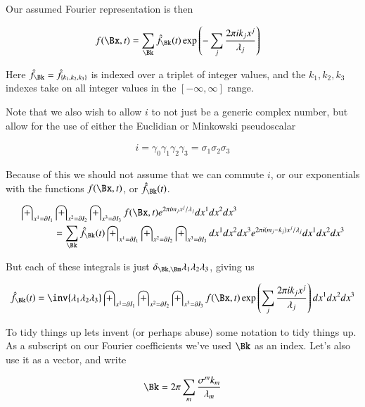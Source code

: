 \documentclass{article}
\begin{document}
Our assumed Fourier representation is then

\begin{align*}
f(\Bx, t) &= \sum_{\Bk} \hat{f}_{\Bk}(t) \exp\left( - \sum_j \frac{2 \pi i k_j x^j}{\lambda_j} \right)
\end{align*}

Here $\hat{f}_{\Bk} = \hat{f}_{\{k_1, k_2, k_3\}}$ is indexed over a triplet of integer values, and the $k_1, k_2, k_3$ indexes take on all integer values in the $[-\infty, \infty]$ range.

Note that we also wish to allow $i$ to not just be a generic complex number, but allow for the use of either the Euclidian or Minkowski pseudoscalar

\begin{align*}
i = \gamma_0 \gamma_1 \gamma_2 \gamma_3 = \sigma_1 \sigma_2 \sigma_3
\end{align*}

Because of this we should not assume that we can commute $i$, or our exponentials with the functions $f(\Bx,t)$, or $\hat{f}_{\Bk}(t)$.

\begin{align*}
\int_{x^1 = \partial I_1} &\int_{x^2 = \partial I_2} \int_{x^3 = \partial I_3} f(\Bx, t) 
e^{ 2 \pi i m_j x^j/\lambda_j}
dx^1 dx^2 dx^3 \\
&= \sum_{\Bk} \hat{f}_{\Bk}(t) \int_{x^1 = \partial I_1} \int_{x^2 = \partial I_2} \int_{x^3 = \partial I_3} dx^1 dx^2 dx^3 e^{ 2 \pi i (m_j - k_j) x^j/\lambda_j} dx^1 dx^2 dx^3
\end{align*}

But each of these integrals is just $\delta_{\Bk,\Bm} \lambda_1 \lambda_2 \lambda_3$, giving us

\begin{align*}
\hat{f}_{\Bk}(t)
&= \inv{\lambda_1 \lambda_2 \lambda_3 } \int_{x^1 = \partial I_1} \int_{x^2 = \partial I_2} \int_{x^3 = \partial I_3} f(\Bx, t) \exp\left( \sum_j \frac{2 \pi i k_j x^j}{\lambda_j} \right) dx^1 dx^2 dx^3 \\
\end{align*}

To tidy things up 
lets invent (or perhaps abuse) some notation to tidy things up.  As a subscript on our Fourier coefficients we've used $\Bk$ as an index.
Let's also use it as a vector, and write

\begin{align*}
\Bk = 2 \pi \sum_m \frac{\sigma^m k_m}{\lambda_m}
\end{align*}
\end{document}
